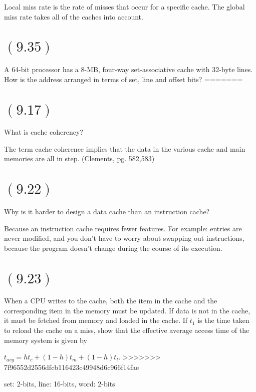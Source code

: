\documentclass[letterpaper,12pt,titlepage]{article}
\begin{document}
\begin{mdframed}[style=MyFrame]
Local miss rate is the rate of misses that occur for a specific cache. The global miss rate takes all of the caches into account.
\end{mdframed}

\section*{$(9.35)$} A 64-bit processor has a 8-MB, four-way set-associative cache with 32-byte lines. How is the address arranged in terms of set, line and offset bits?
=======
\section*{$(9.17)$} What is cache coherency?

\begin{mdframed}[style=MyFrame]
The term cache coherence implies that the data in the various cache and main memories are all in step. (Clements, pg. 582,583)
\end{mdframed}

\section*{$(9.22)$} Why is it harder to design a data cache than an instruction cache?

\begin{mdframed}[style=MyFrame]
Because an instruction cache requires fewer features. For example: entries are never modified, and you don't have to worry about swapping out instructions, because the program doesn't change during the course of its execution.
\end{mdframed}

\section*{$(9.23)$} When a CPU writes to the cache, both the item in the cache and the corresponding item in the memory must be updated. If data is not in the cache, it must be fetched from memory and loaded in the cache. If $t_1$ is the time taken to reload the cache on a miss, show that the effective average access time of the memory system is given by

$t_{avg} = ht_{c} + (1 - h)t_{m} + (1 - h)t_{l}$.
>>>>>>> 7f96552d2556dfcb116423c49948d6c966f14fae

\begin{mdframed}[style=MyFrame]
set: 2-bits, line: 16-bits, word: 2-bits
\end{mdframed}
\end{document}
